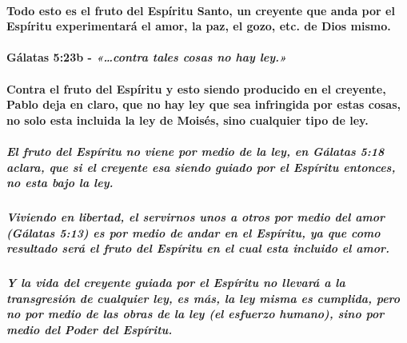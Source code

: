 \documentclass[11a pt,twoside]{article}
\newcommand{\scripture}[1]{%
  {\fontsize{12pt}{16pt}\selectfont\ScriptureFont\itshape #1}%
}
\let\oldparagraph\paragraph
\renewcommand{\paragraph}{\needspace{3\baselineskip}\oldparagraph}
\let\oldsubparagraph\subparagraph
\renewcommand{\subparagraph}{\needspace{2\baselineskip}\oldsubparagraph}
\begin{document}
\paragraph{Todo esto es el fruto del Espíritu Santo, un creyente que
anda por el Espíritu experimentará el amor, la paz, el gozo, etc. de
Dios
mismo.}\label{todo-esto-es-el-fruto-del-espuxedritu-santo-un-creyente-que-anda-por-el-espuxedritu-experimentaruxe1-el-amor-la-paz-el-gozo-etc.-de-dios-mismo.}

\paragraph{\texorpdfstring{Gálatas 5:23b -
\scripture{«…contra tales cosas no hay ley.»}}{Gálatas 5:23b - }}\label{guxe1latas-523b---contra-tales-cosas-no-hay-ley.}

\paragraph{Contra el fruto del Espíritu y esto siendo producido en el
creyente, Pablo deja en claro, que no hay ley que sea infringida por
estas cosas, no solo esta incluida la ley de Moisés, sino cualquier tipo
de
ley.}\label{contra-el-fruto-del-espuxedritu-y-esto-siendo-producido-en-el-creyente-pablo-deja-en-claro-que-no-hay-ley-que-sea-infringida-por-estas-cosas-no-solo-esta-incluida-la-ley-de-moisuxe9s-sino-cualquier-tipo-de-ley.}

\subparagraph{El fruto del Espíritu no viene por medio de la ley, en
Gálatas 5:18 aclara, que si el creyente esa siendo guiado por el
Espíritu entonces, no esta bajo la
ley.}\label{el-fruto-del-espuxedritu-no-viene-por-medio-de-la-ley-en-guxe1latas-518-aclara-que-si-el-creyente-esa-siendo-guiado-por-el-espuxedritu-entonces-no-esta-bajo-la-ley.}

\subparagraph{Viviendo en libertad, el servirnos unos a otros por medio
del amor (Gálatas 5:13) es por medio de andar en el Espíritu, ya que
como resultado será el fruto del Espíritu en el cual esta incluido el
amor.}\label{viviendo-en-libertad-el-servirnos-unos-a-otros-por-medio-del-amor-guxe1latas-513-es-por-medio-de-andar-en-el-espuxedritu-ya-que-como-resultado-seruxe1-el-fruto-del-espuxedritu-en-el-cual-esta-incluido-el-amor.}

\subparagraph{Y la vida del creyente guiada por el Espíritu no llevará a
la transgresión de cualquier ley, es más, la ley misma es cumplida, pero
no por medio de las obras de la ley (el esfuerzo humano), sino por medio
del Poder del
Espíritu.}\label{y-la-vida-del-creyente-guiada-por-el-espuxedritu-no-llevaruxe1-a-la-transgresiuxf3n-de-cualquier-ley-es-muxe1s-la-ley-misma-es-cumplida-pero-no-por-medio-de-las-obras-de-la-ley-el-esfuerzo-humano-sino-por-medio-del-poder-del-espuxedritu.}
\end{document}

